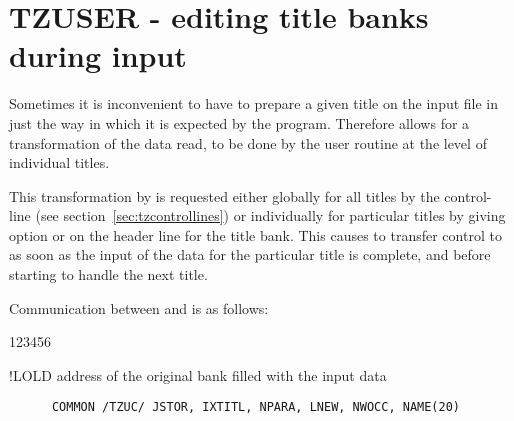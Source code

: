 \section{TZUSER - editing title banks during input}

Sometimes it is inconvenient to have to prepare
a given title on the input file in just the way in which
it is expected by the program.
Therefore  allows for a transformation of the data read,
to be done by the user routine 
at the level of individual titles.

This transformation by  is requested either globally
for all titles by the control-line    (see section~\ref{sec:tzcontrollines})
or individually for particular titles by giving
option  or  on the header line for the title bank.
This causes  to transfer control to  as soon
as the input of the data for the particular title is complete,
and before starting to handle the next title.

Communication between  and  is as follows:


\begin{DLtt}{123456}
\item[!LOLD] address of the original bank filled with the input data
\end{DLtt}

\begin{verbatim}
      COMMON /TZUC/ JSTOR, IXTITL, NPARA, LNEW, NWOCC, NAME(20)
\end{verbatim}

